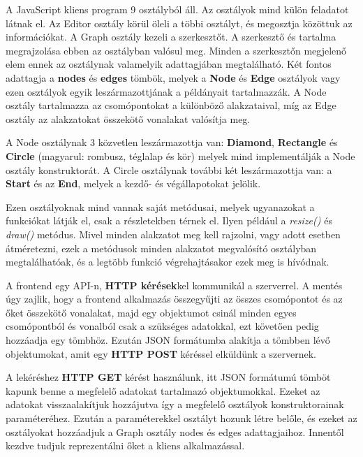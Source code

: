 A JavaScript kliens program 9 osztályból áll. Az osztályok mind külön feladatot látnak el. Az Editor osztály körül öleli a többi osztályt, és megosztja közöttuk az információkat. A Graph osztály kezeli a szerkesztőt. A szerkesztő és tartalma megrajzolása ebben az osztályban valósul meg. Minden a szerkesztőn megjelenő elem ennek az osztálynak valamelyik adattagjában megtalálható. Két fontos adattagja a \textbf{nodes} és \textbf{edges} tömbök, melyek a \textbf{Node} és \textbf{Edge} osztályok vagy ezen osztályok egyik leszármazottjának a példányait tartalmazzák. A Node osztály tartalmazza az csomópontokat a különböző alakzataival, míg az Edge osztály az alakzatokat összekötő vonalakat valósítja meg.
 
A Node osztálynak 3 közvetlen leszármazottja van: \textbf{Diamond}, \textbf{Rectangle} és \textbf{Circle} (magyarul: rombusz, téglalap és kör) melyek mind implementálják a Node osztály konstruktorát. A Circle osztálynak további két leszármazottja van: a \textbf{Start} és az \textbf{End}, melyek a kezdő- és végállapotokat jelölik.
 

Ezen osztályoknak mind vannak saját metódusai, melyek ugyanazokat a funkciókat látják el, csak a részletekben térnek el. Ilyen például a \textit{resize()} és \textit{draw()} metódus. Mivel minden alakzatot meg kell rajzolni, vagy adott esetben átméretezni, ezek a metódusok minden alakzatot megvalósító osztályban megtalálhatóak, és a legtöbb funkció végrehajtásakor ezek meg is hívódnak.
 
A frontend egy API-n, \textbf{HTTP kérések}kel kommunikál a szerverrel. A mentés úgy zajlik, hogy a frontend alkalmazás összegyűjti az összes csomópontot és az őket összekötő vonalakat, majd egy objektumot csinál minden egyes csomópontból és vonalból csak a szükséges adatokkal, ezt követően pedig hozzáadja egy tömbhöz. Ezután JSON formátumba alakítja a tömbben lévő objektumokat, amit egy \textbf{HTTP POST} kéréssel elküldünk a szervernek.

A lekéréshez \textbf{HTTP GET} kérést használunk, itt JSON formátumú tömböt kapunk benne a megfelelő adatokat tartalmazó objektumokkal. Ezeket az adatokat visszaalakítjuk hozzájutva így a megfelelő osztályok konstruktorainak paraméteréhez. Ezután a paraméterekkel osztályt hozunk létre belőle, és ezeket az osztályokat hozzáadjuk a Graph osztály nodes és edges adattagjaihoz. Innentől kezdve tudjuk reprezentálni őket a kliens alkalmazással.
 
